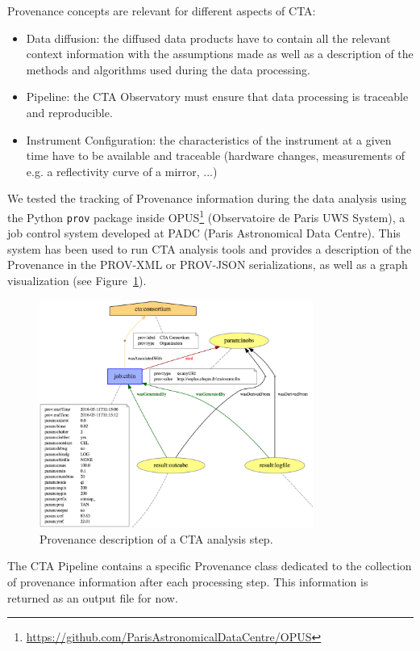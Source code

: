 Provenance concepts are relevant for different aspects of CTA:
\begin{itemize}
\item Data diffusion: the diffused data products have to contain all the relevant context information with the assumptions made as well as a description of the methods and algorithms used during the data processing.
\item Pipeline: the CTA Observatory must ensure that data processing is traceable and reproducible.
\item Instrument Configuration: the characteristics of the instrument at a given time have to be available and traceable (hardware changes, measurements of e.g. a reflectivity curve of a mirror, ...)
\end{itemize}

We tested the tracking of Provenance information during the data analysis using the Python \texttt{prov} package inside OPUS\footnote{\url{https://github.com/ParisAstronomicalDataCentre/OPUS}} (Observatoire de Paris UWS System), a job control system developed at PADC (Paris Astronomical Data Centre). This system has been used to run CTA analysis tools and provides a description of the Provenance in the PROV-XML or PROV-JSON serializations, as well as a graph visualization (see Figure~\ref{fig:cta_prov}).

\begin{figure}
\centering
\includegraphics[width=0.8\textwidth]{CTA_prov.png}
\caption[Provenance description of a CTA analysis step]{Provenance description of a CTA analysis step.}
\label{fig:cta_prov}
\end{figure}

The CTA Pipeline contains a specific Provenance class dedicated to the collection of provenance information after each processing step. This information is returned as an output file for now.

